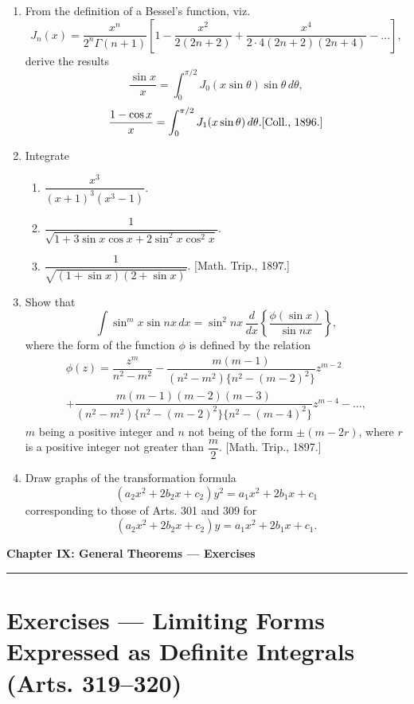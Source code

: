 \documentclass[11pt, a4paper]{article}
\newcommand{\source}[1]{\hfill\textnormal{[#1]}}
\begin{document}
\begin{enumerate}[leftmargin=2em]
\item From the definition of a Bessel's function, viz.
\[
J_n(x)=\dfrac{x^n}{2^n\Gamma(n+1)}\left[1-\dfrac{x^2}{2(2n+2)}+\dfrac{x^4}{2\cdot4(2n+2)(2n+4)}-\dots\right],
\]
derive the results
\[
\dfrac{\sin x}{x}=\int_0^{\pi/2}J_0(x\sin\theta)\sin\theta\,d\theta,
\]
\[
\dfrac{1-\cos x}{x}=\int_0^{\pi/2}J_1(x\sin\theta)\,d\theta. \source{Coll., 1896.}
\]

\item Integrate
\begin{enumerate}[label=(\roman*)]
\item $\dfrac{x^3}{(x+1)^3(x^3-1)}$.
\item $\dfrac{1}{\sqrt{1+3\sin x\cos x+2\sin^2x\cos^2x}}$.
\item $\dfrac{1}{\sqrt{(1+\sin x)(2+\sin x)}}$. \source{Math. Trip., 1897.}
\end{enumerate}

\item Show that
\[
\int \sin^mx\sin nx\,dx=\sin^2nx\,\dfrac{d}{dx}\left\{\dfrac{\phi(\sin x)}{\sin nx}\right\},
\]
where the form of the function $\phi$ is defined by the relation
\begin{multline*}
\phi(z)=\dfrac{z^m}{n^2-m^2}-\dfrac{m(m-1)}{(n^2-m^2)\{n^2-(m-2)^2\}}z^{m-2}\\
+\dfrac{m(m-1)(m-2)(m-3)}{(n^2-m^2)\{n^2-(m-2)^2\}\{n^2-(m-4)^2\}}z^{m-4}-\dots,
\end{multline*}
$m$ being a positive integer and $n$ not being of the form $\pm(m-2r)$, where $r$ is a positive integer not greater than $\dfrac m2$. \source{Math. Trip., 1897.}

\item Draw graphs of the transformation formula
\[
(a_2x^2+2b_2x+c_2)y^2=a_1x^2+2b_1x+c_1
\]
corresponding to those of Arts. 301 and 309 for
\[
(a_2x^2+2b_2x+c_2)y=a_1x^2+2b_1x+c_1.
\]

\end{enumerate}

\newpage

\begin{center}
    {\LARGE \bfseries \color{accent} Chapter IX: General Theorems --- Exercises}\\
    \vspace{0.2cm}
    {\color{accent}\rule{0.55\linewidth}{0.8pt}}
\end{center}
\vspace{0.35cm}

\section*{Exercises --- Limiting Forms Expressed as Definite Integrals (Arts. 319--320)}
\end{document}
